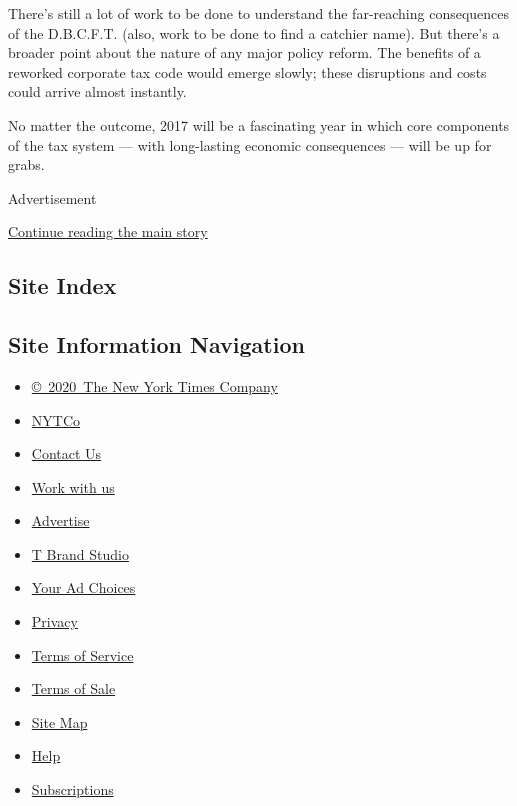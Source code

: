 There's still a lot of work to be done to understand the far-reaching
consequences of the D.B.C.F.T. (also, work to be done to find a catchier
name). But there's a broader point about the nature of any major policy
reform. The benefits of a reworked corporate tax code would emerge
slowly; these disruptions and costs could arrive almost instantly.

No matter the outcome, 2017 will be a fascinating year in which core
components of the tax system --- with long-lasting economic consequences
--- will be up for grabs.

Advertisement

\protect\hyperlink{after-bottom}{Continue reading the main story}

\hypertarget{site-index}{%
\subsection{Site Index}\label{site-index}}

\hypertarget{site-information-navigation}{%
\subsection{Site Information
Navigation}\label{site-information-navigation}}

\begin{itemize}
\tightlist
\item
  \href{https://help.nytimes.com/hc/en-us/articles/115014792127-Copyright-notice}{©~2020~The
  New York Times Company}
\end{itemize}

\begin{itemize}
\tightlist
\item
  \href{https://www.nytco.com/}{NYTCo}
\item
  \href{https://help.nytimes.com/hc/en-us/articles/115015385887-Contact-Us}{Contact
  Us}
\item
  \href{https://www.nytco.com/careers/}{Work with us}
\item
  \href{https://nytmediakit.com/}{Advertise}
\item
  \href{http://www.tbrandstudio.com/}{T Brand Studio}
\item
  \href{https://www.nytimes.com/privacy/cookie-policy\#how-do-i-manage-trackers}{Your
  Ad Choices}
\item
  \href{https://www.nytimes.com/privacy}{Privacy}
\item
  \href{https://help.nytimes.com/hc/en-us/articles/115014893428-Terms-of-service}{Terms
  of Service}
\item
  \href{https://help.nytimes.com/hc/en-us/articles/115014893968-Terms-of-sale}{Terms
  of Sale}
\item
  \href{https://spiderbites.nytimes.com}{Site Map}
\item
  \href{https://help.nytimes.com/hc/en-us}{Help}
\item
  \href{https://www.nytimes.com/subscription?campaignId=37WXW}{Subscriptions}
\end{itemize}
